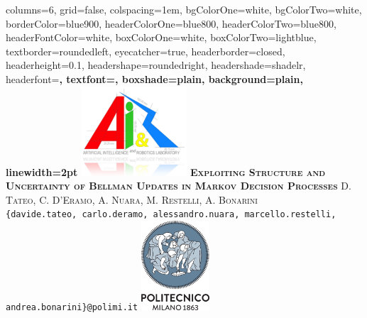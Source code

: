 \documentclass[portrait,a0paper,fontscale=0.312]{baposter}
\begin{document}
\begin{poster}%
  {
  columns=6,
  grid=false,
  colspacing=1em,
  bgColorOne=white,
  bgColorTwo=white,
  borderColor=blue900,
  headerColorOne=blue800,
  headerColorTwo=blue800,
  headerFontColor=white,
  boxColorOne=white,
  boxColorTwo=lightblue,
  textborder=roundedleft,
  eyecatcher=true,
  headerborder=closed,
  headerheight=0.1\textheight,
  headershape=roundedright,
  headershade=shadelr,
  headerfont=\Large\bf\textsc, %
  textfont={\setlength{\parindent}{1.5em}},
  boxshade=plain,
  background=plain,
  linewidth=2pt
  }
  {\includegraphics[height=9em]{./pics/airlab_logo_reflect.png}} 
  {\bf\textsc{Exploiting Structure and Uncertainty of Bellman Updates in Markov Decision Processes}\vspace{0.1em}}
  {\textsc{D. Tateo, C. D'Eramo, A. Nuara, M. Restelli, A. Bonarini}\\ {\normalsize \texttt{\{davide.tateo, carlo.deramo, alessandro.nuara, marcello.restelli, andrea.bonarini\}@polimi.it}}}
  {%
    \includegraphics[height=9.0em]{./pics/polilogo/logoPoliBlue_poster.png}
  }


\end{poster}
\end{document}
